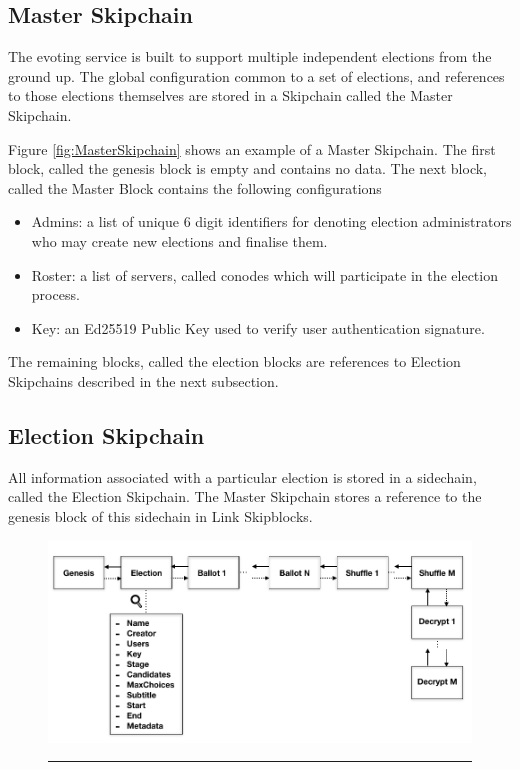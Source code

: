 \subsection{Master Skipchain}

The evoting service is built to support multiple independent elections from the ground up. The global configuration common to a set of elections, and references to those elections themselves are stored in a Skipchain called the Master Skipchain.

Figure \ref{fig:MasterSkipchain} shows an example of a Master Skipchain. The first block, called the genesis block is empty and contains no data. The next block, called the Master Block contains the following configurations

\begin{itemize}
\item Admins: a list of unique 6 digit identifiers for denoting election administrators who may create new elections and finalise them.
\item Roster: a list of servers, called conodes which will participate in the election process.
\item Key: an Ed25519 Public Key used to verify user authentication signature.
\end{itemize}

The remaining blocks, called the election blocks are references to Election Skipchains described in the next subsection.

\subsection{Election Skipchain}

All information associated with a particular election is stored in a sidechain, called the Election Skipchain. The Master Skipchain stores a reference to the genesis block of this sidechain in Link Skipblocks.

\begin{figure}[ht]
  \centering
    \includegraphics[scale=0.4]{Figures/ElectionSkipchain.png}
    \rule{35em}{0.5pt}
  \caption[Election Skipchain]{}
  \label{fig:ElectionSkipchain}
\end{figure}

